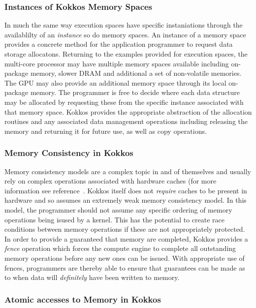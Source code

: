 \subsubsection{Instances of Kokkos Memory Spaces}

In much the same way execution spaces have specific instaniations through
the availablilty of an {\em instance} so do memory spaces. An instance
of a memory space provides a concrete method for the
application programmer to request data storage allocatons. Returning
to the examples provided for execution spaces, the multi-core
processor may have multiple memory spaces available including
on-package memory, slower DRAM and additional a set of non-volatile
memories. The GPU may also provide an additional memory space
through its local on-package memory. The programmer is free
to decide where each data structure may be allocated by requesting
these from the specific instance associated with that memory space.
Kokkos provides the appropriate abstraction of the allocation
routines and any associated data management operations including
releasing the memory and returning it for future use, as well as
copy operations.

\subsubsection{Memory Consistency in Kokkos}

Memory consistency models are a complex topic in and of themselves
and usually rely on complex operations associated with hardware
caches (for more information see reference~\cite{handp_hardware}. 
Kokkos itself does not {\em require} caches to be present
in hardware and so assumes an extremely weak memory consistency
model. In this model, the programmer should not assume any
specific ordering of memory operations being isused by a
kernel. This has the potential to create race conditions between
memory operations if these are not appropriately protected. In
order to provide a guaranteed that memory are completed, Kokkos
provides a {\em fence} operation which forces the compute 
engine to complete all outstanding memory operations before
any new ones can be issued. With appropriate use of fences,
programmers are thereby able to ensure that guarantees can
be made as to when data will {\em definitely} have been 
written to memory.

\subsubsection{Atomic accesses to Memory in Kokkos}


